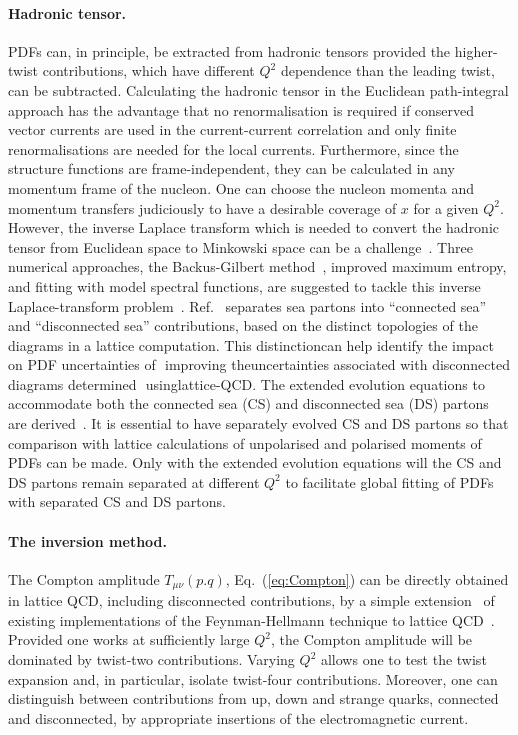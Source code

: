 \paragraph*{Hadronic tensor.} 
PDFs can, in principle, be extracted from hadronic tensors provided the 
higher-twist contributions, which have different $Q^2$ dependence than the 
leading twist, can be subtracted. 
%
Calculating the hadronic tensor in the Euclidean path-integral approach
has the advantage that no renormalisation is required if conserved vector      
currents are used in the current-current correlation and only finite 
renormalisations are needed for the local currents.
%
Furthermore, since the structure functions are frame-independent, they 
can be calculated in any momentum frame of the nucleon. 
%
One can choose the nucleon momenta and momentum transfers judiciously 
to have a desirable coverage of $x$ for a given $Q^2$. 
%
However, the inverse Laplace transform which is needed to convert the hadronic tensor from Euclidean space to Minkowski space can be a 
challenge~\cite{Liu:1993cv,Liu:1999ak}. 
%
Three numerical approaches, the Backus-Gilbert method~\cite{Hansen:2017mnd}, 
improved maximum entropy, and fitting with model spectral functions, 
are suggested to tackle this inverse Laplace-transform 
problem~\cite{Liu:2016djw}. 
%
Ref.~\cite{Liu:1993cv} separates sea partons into ``connected sea'' and 
``disconnected sea'' contributions, based on the distinct topologies of the 
diagrams in a lattice computation. 
%
This​ ​distinction​ ​can​ ​help​ ​identify​ ​the​ ​impact​ ​on​ ​PDF​ ​uncertainties​ ​of​ ​
improving the​ ​uncertainties​ ​associated​ ​with​ ​disconnected​ ​diagrams​ ​determined​ ​
using​ ​lattice-QCD.
%
The extended evolution equations to accommodate both the connected sea 
(CS) and disconnected sea (DS) partons are derived~\cite{Liu:2017lpe}.
%
It is essential to have separately evolved CS and DS partons so that 
comparison with lattice calculations of unpolarised and polarised moments of
PDFs can be made. 
%
Only with the extended evolution equations will the CS and DS partons 
remain separated at different $Q^2$ to facilitate global fitting 
of PDFs with separated CS and DS partons.

\paragraph*{The inversion method.} 
\label{Sec:InversionMethod}

The Compton amplitude $T_{\mu\nu}(p.q)$, Eq.~(\ref{eq:Compton}) can be
directly obtained in lattice QCD, including disconnected contributions,  by a simple extension~\cite{Chambers:2017dov} of existing implementations of the Feynman-Hellmann technique to lattice QCD~\cite{Horsley:2012pz,Chambers:2014qaa,Chambers:2015bka}.
%
Provided one works at sufficiently large $Q^2$, the Compton amplitude will be dominated by twist-two contributions.
%
Varying $Q^2$ allows one to test the twist expansion and, in particular, isolate twist-four contributions. Moreover, one can distinguish between contributions from up, down and strange quarks, connected and disconnected, by appropriate insertions of the electromagnetic current.

